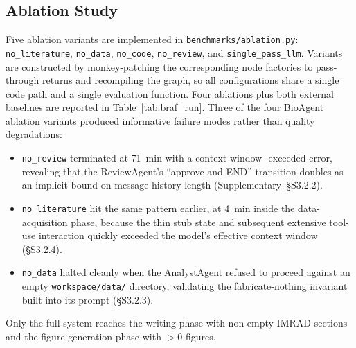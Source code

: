 \documentclass[11pt]{article}
\begin{document}
\subsection{Ablation Study}
\label{sec:ablation}

Five ablation variants are implemented in
\texttt{benchmarks/ablation.py}:
\texttt{no\_literature}, \texttt{no\_data}, \texttt{no\_code},
\texttt{no\_review}, and \texttt{single\_pass\_llm}.
Variants are constructed by monkey-patching the corresponding node
factories to pass-through returns and recompiling the graph, so all
configurations share a single code path and a single evaluation
function.
Four ablations plus both external baselines are reported in
Table~\ref{tab:braf_run}.
Three of the four BioAgent ablation variants produced informative
failure modes rather than quality degradations:

\begin{itemize}
  \item \texttt{no\_review} terminated at 71~min with a context-window-
        exceeded error, revealing that the ReviewAgent's ``approve and
        END'' transition doubles as an implicit bound on message-history
        length (Supplementary~\S S3.2.2).
  \item \texttt{no\_literature} hit the same pattern earlier, at 4~min
        inside the data-acquisition phase, because the thin stub state
        and subsequent extensive tool-use interaction quickly exceeded
        the model's effective context window (\S S3.2.4).
  \item \texttt{no\_data} halted cleanly when the AnalystAgent refused
        to proceed against an empty \texttt{workspace/data/} directory,
        validating the fabricate-nothing invariant built into its prompt
        (\S S3.2.3).
\end{itemize}

Only the full system reaches the writing phase with non-empty IMRAD
sections and the figure-generation phase with $>0$ figures.
\end{document}
